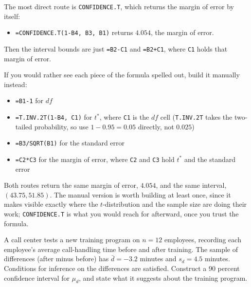 The most direct route is \texttt{CONFIDENCE.T}, which returns the margin of error by itself:
\begin{itemize}
    \item \texttt{=CONFIDENCE.T(1-B4, B3, B1)} returns $4.054$, the margin of error.
\end{itemize}
 
Then the interval bounds are just \texttt{=B2-C1} and \texttt{=B2+C1}, where \texttt{C1} holds that margin of error.
 
If you would rather see each piece of the formula spelled out, build it manually instead:
\begin{itemize}
    \item \texttt{=B1-1} for $df$
    \item \texttt{=T.INV.2T(1-B4, C1)} for $t^*$, where \texttt{C1} is the $df$ cell (\texttt{T.INV.2T} takes the two-tailed probability, so use $1 - 0.95 = 0.05$ directly, not $0.025$)
    \item \texttt{=B3/SQRT(B1)} for the standard error
    \item \texttt{=C2*C3} for the margin of error, where \texttt{C2} and \texttt{C3} hold $t^*$ and the standard error
\end{itemize}
 
Both routes return the same margin of error, $4.054$, and the same interval, $(43.75, 51.85)$. The manual version is worth building at least once, since it makes visible exactly where the $t$-distribution and the sample size are doing their work; \texttt{CONFIDENCE.T} is what you would reach for afterward, once you trust the formula.
 
 
\begin{Exercise}[title={A Matched-Pairs Interval}, label={ex:means-ci-paired}]
A call center tests a new training program on $n = 12$ employees, recording each employee's average call-handling time before and after training. The sample of differences (after minus before) has $\bar{d} = -3.2$ minutes and $s_d = 4.5$ minutes. Conditions for inference on the differences are satisfied. Construct a 90 percent confidence interval for $\mu_d$, and state what it suggests about the training program.
\end{Exercise}
 
